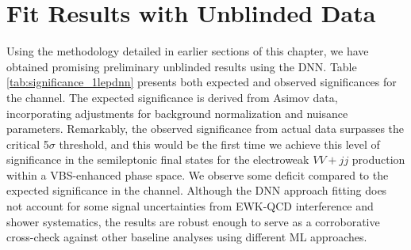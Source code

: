 \clearpage
\section{Fit Results with Unblinded Data}


Using the methodology detailed in earlier sections of this chapter, we have obtained promising preliminary unblinded results using the DNN. 
Table \ref{tab:significance_1lepdnn} presents both expected and observed significances for the \olep channel. 
The expected significance is derived from Asimov data, incorporating adjustments for background normalization and nuisance parameters. 
Remarkably, the observed significance from actual data surpasses the critical 5$\sigma$ threshold, 
and this would be the first time we achieve this level of significance in the semileptonic final states for the electroweak $VV+jj$ production within a VBS-enhanced phase space.
We observe some deficit compared to the expected significance in the \olep channel.
Although the DNN approach fitting does not account for some signal uncertainties from EWK-QCD interference and shower systematics, the results are robust enough to serve as a corroborative cross-check against other baseline analyses using different ML approaches.

